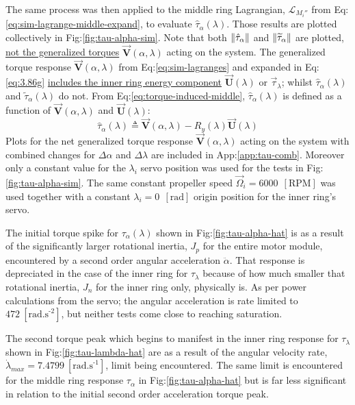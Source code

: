 The same process was then applied to the middle ring Lagrangian, $\mathcal{L}_{M_i''}$ from Eq:\ref{eq:sim-lagrange-middle-expand}, to evaluate $\hat{\tau}_\alpha(\lambda)$. Those results are plotted collectively in Fig:\ref{fig:tau-alpha-sim}. Note that both $\left\lVert\hat{\tau}_\alpha\right\rVert$ and $\left\lVert\widetilde{\tau}_\alpha\right\rVert$ are plotted, \underline{not the generalized torques} $\vec{\mathbf{V}}(\alpha,\lambda)$ acting on the system. The generalized torque response $\vec{\mathbf{V}}(\alpha,\lambda)$ from Eq:\ref{eq:sim-lagranges} and expanded in Eq:\ref{eq:3.86g} \underline{includes the inner ring energy component} $\vec{\mathbf{U}}(\lambda)$ or $\vec{\tau}_\lambda$; whilst $\hat{\tau}_\alpha(\lambda)$ and $\tilde{\tau}_\alpha(\lambda)$ do not. From Eq:\ref{eq:torque-induced-middle}, $\hat{\tau}_\alpha(\lambda)$ is defined as a function of $\vec{\mathbf{V}}(\alpha,\lambda)$ and $\vec{\mathbf{U}}(\lambda)$:
\begin{equation}
\hat{\tau}_\alpha(\lambda)\triangleq \vec{\mathbf{V}}(\alpha,\lambda)-R_y(\lambda)\vec{\mathbf{U}}(\lambda)
\end{equation}
Plots for the net generalized torque response $\vec{\mathbf{V}}(\alpha,\lambda)$ acting on the system with combined changes for $\Delta\alpha$ and $\Delta\lambda$ are included in App:\ref{app:tau-comb}. Moreover only a constant value for the $\lambda_i$ servo position was used for the tests in Fig:\ref{fig:tau-alpha-sim}. The same constant propeller speed $\vec{\Omega}_i=6000~~[\text{RPM}]$ was used together with a constant $\lambda_i=0~~[\text{rad}]$ origin position for the inner ring's servo.
\par
The initial torque spike for $\tau_\alpha(\lambda)$ shown in Fig:\ref{fig:tau-alpha-hat} is as a result of the significantly larger rotational inertia, $J_{p}$ for the entire motor module, encountered by a second order angular acceleration $\ddot{\alpha}$. That response is depreciated in the case of the inner ring for $\tau_\lambda$ because of how much smaller that rotational inertia, $J_n$ for the inner ring only, physically is. As per power calculations from the servo; the angular acceleration is rate limited to $472~[\text{rad.s}^{\text{-}2}]$, but neither tests come close to reaching saturation.
\par
The second torque peak which begins to manifest in the inner ring response for $\tau_\lambda$ shown in Fig:\ref{fig:tau-lambda-hat} are as a result of the angular velocity rate, $\dot{\lambda}_{max}=7.4799~[\text{rad.s}^{\text{-}1}]$, limit being encountered. The same limit is encountered for the middle ring response $\tau_\alpha$ in Fig:\ref{fig:tau-alpha-hat} but is far less significant in relation to the initial second order acceleration torque peak.
